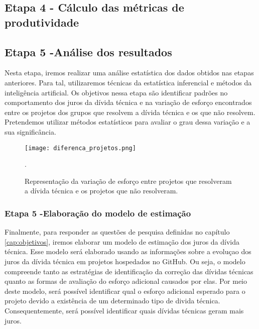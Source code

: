 \subsection{Etapa 4 - Cálculo das métricas de produtividade}


\subsection{Etapa 5 -Análise dos resultados}

 Nesta etapa, iremos realizar uma análise estatística dos dados obtidos nas etapas anteriores. Para tal, utilizaremos técnicas da estatística inferencial e métodos da inteligência artificial. Os objetivos nessa etapa são identificar padrões no comportamento dos juros da dívida técnica e na variação de esforço encontrados entre os projetos dos grupos que resolvem a dívida técnica e os que não resolvem. Pretendemos utilizar métodos estatísticos para avaliar o grau dessa variação e a sua significância. 









\begin{figure}[h]
  \centering
  \texttt{[image: diferenca\_projetos.png]} 
  \caption{Representação da variação de esforço entre projetos que resolveram a dívida técnica e os projetos que não resolveram. }.
  \label{fig:variacao_projetos} 
\end{figure}








\subsubsection{Etapa 5 -Elaboração do modelo de estimação}
\label{sec:analise_dados_modelo}

Finalmente, para responder as questões de pesquisa definidas no capítulo \ref{cap:objetivos}, iremos elaborar um modelo de estimação dos juros da dívida técnica. Esse modelo será elaborado usando as informações sobre a evoluçao dos juros da dívida técnica em projetos hospedados no GitHub. Ou seja, o modelo compreende tanto as estratégias de identificação da correção das dívidas técnicas quanto as formas de avaliação do esforço adicional causados por elas.   Por meio deste modelo, será possível identificar qual o esforço adicional esperado para o projeto devido a existência de um determinado tipo de divida técnica. Consequentemente, será possível identificar quais dívidas técnicas geram mais juros.

